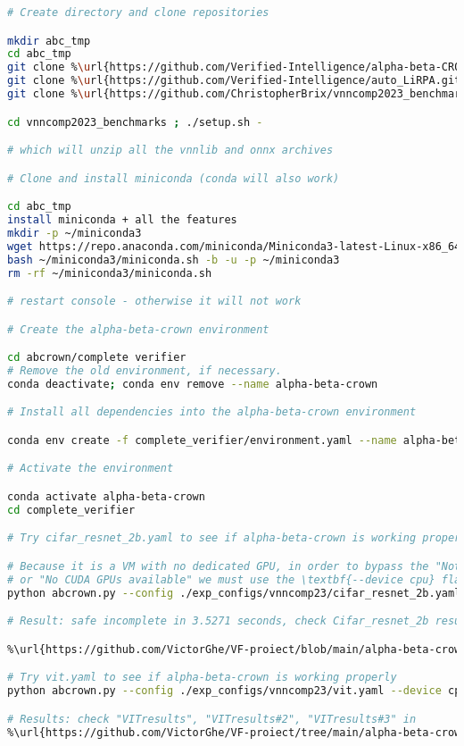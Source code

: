\documentclass[runningheads]{llncs}
\begin{document}
\begin{lstlisting}[language=bash]
# Create directory and clone repositories

mkdir abc_tmp
cd abc_tmp
git clone %\url{https://github.com/Verified-Intelligence/alpha-beta-CROWN.git}%
git clone %\url{https://github.com/Verified-Intelligence/auto_LiRPA.git}% in abcrown/autolirpa
git clone %\url{https://github.com/ChristopherBrix/vnncomp2023_benchmarks.git}% in abc_tmp

cd vnncomp2023_benchmarks ; ./setup.sh - 

# which will unzip all the vnnlib and onnx archives

# Clone and install miniconda (conda will also work)

cd abc_tmp
install miniconda + all the features
mkdir -p ~/miniconda3
wget https://repo.anaconda.com/miniconda/Miniconda3-latest-Linux-x86_64.sh -O ~/miniconda3/miniconda.sh
bash ~/miniconda3/miniconda.sh -b -u -p ~/miniconda3
rm -rf ~/miniconda3/miniconda.sh

# restart console - otherwise it will not work

# Create the alpha-beta-crown environment

cd abcrown/complete verifier
# Remove the old environment, if necessary.
conda deactivate; conda env remove --name alpha-beta-crown

# Install all dependencies into the alpha-beta-crown environment

conda env create -f complete_verifier/environment.yaml --name alpha-beta-crown

# Activate the environment

conda activate alpha-beta-crown
cd complete_verifier

# Try cifar_resnet_2b.yaml to see if alpha-beta-crown is working properly

# Because it is a VM with no dedicated GPU, in order to bypass the "Not enough memory" 
# or "No CUDA GPUs available" we must use the \textbf{--device cpu} flag
python abcrown.py --config ./exp_configs/vnncomp23/cifar_resnet_2b.yaml --device cpu 

# Result: safe incomplete in 3.5271 seconds, check Cifar_resnet_2b results.txt in

%\url{https://github.com/VictorGhe/VF-proiect/blob/main/alpha-beta-crown/}%

# Try vit.yaml to see if alpha-beta-crown is working properly
python abcrown.py --config ./exp_configs/vnncomp23/vit.yaml --device cpu

# Results: check "VITresults", "VITresults#2", "VITresults#3" in 
%\url{https://github.com/VictorGhe/VF-proiect/tree/main/alpha-beta-crown}%
\end{lstlisting}
\end{document}
